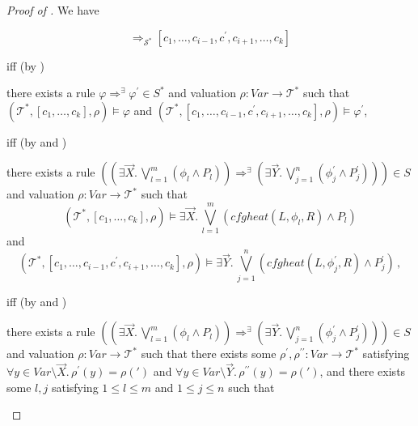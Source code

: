 \documentclass{article}
\newenvironment{proofenv}
  {
    \VerbatimEnvironment\begin{tcolorbox}[colback=black!0!white] %
  }
  {
   \end{tcolorbox}
  }
\begin{document}
\begin{proof}[Proof of ]
We have
\begin{proofenv}
\begin{equation*}
[c_1,\ldots,c_k] \Rightarrow_{\mathcal{S}^*} [c_1, \ldots, c_{i-1}, c^\prime, c_{i+1}, \ldots, c_k]    
\end{equation*}
\end{proofenv}
iff (by )
\begin{proofenv}
there exists a rule $\varphi \Rightarrow^\exists \varphi^\prime \in S^*$
and valuation $\rho : \mathit{Var} \to \mathcal{T}^*$ such that
$(\mathcal{T}^*, [c_1,\ldots,c_k], \rho) \vDash \varphi$
and $(\mathcal{T}^*, [c_1, \ldots, c_{i-1}, c^\prime, c_{i+1}, \ldots, c_k], \rho) \vDash \varphi^\prime$,
\end{proofenv}
iff (by
 and )
\begin{proofenv}
there exists a rule $((\exists \vec{X}.\, \bigvee_{l=1}^{m} (\phi_l \land P_l)) \Rightarrow^\exists (\exists \vec{Y}.\, \bigvee_{j=1}^{n} (\phi^\prime_j \land P^\prime_j))) \in S$
and valuation $\rho : \mathit{Var} \to \mathcal{T}^*$ such that
\begin{equation*}
    (\mathcal{T}^*, [c_1,\ldots,c_k], \rho) \vDash \exists \vec{X}.\, \bigvee_{l=1}^{m}(\mathit{cfgheat}(L, \phi_l, R) \land P_l)
\end{equation*}
and
\begin{equation*}
    (\mathcal{T}^*, [c_1, \ldots, c_{i-1}, c^\prime, c_{i+1}, \ldots, c_k], \rho) \vDash
    \exists \vec{Y}.\, \bigvee_{j=1}^{n}(\mathit{cfgheat}(L, \phi^\prime_j, R) \land P^\prime_j) \, ,
\end{equation*}
\end{proofenv}
iff (by  and )
\begin{proofenv}
there exists a rule $((\exists \vec{X}.\, \bigvee_{l=1}^{m} (\phi_l \land P_l)) \Rightarrow^\exists (\exists \vec{Y}.\, \bigvee_{j=1}^{n} (\phi^\prime_j \land P^\prime_j))) \in S$
and valuation $\rho : \mathit{Var} \to \mathcal{T}^*$ such that
there exists some $\rho^\prime,\rho^{\prime\prime} : \mathit{Var} \to \mathcal{T}^*$
satisfying $\forall y \in \mathit{Var} \setminus \vec{X}.\, \rho^\prime(y) = \rho(\prime)$
and $\forall y \in \mathit{Var} \setminus \vec{Y}.\, \rho^{\prime\prime}(y) = \rho(\prime)$,
and there exists some $l,j$ satisfying $1 \leq l \leq m$ and $1 \leq j \leq n$ such that

\end{proofenv}
\end{proof}
\end{document}
